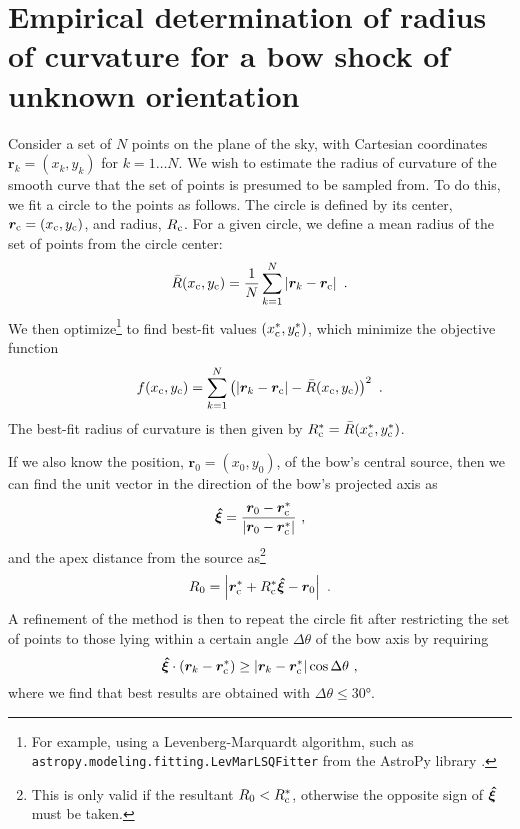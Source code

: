\section{Empirical determination of radius of curvature for a bow shock of unknown orientation}
\label{app:rcurv-empirical}

Consider a set of \(N\) points on the plane of the sky, with Cartesian
coordinates \(\bm{r}_k = (x_k, y_k)\) for \(k = 1 \dots N\).  We wish
to estimate the radius of curvature of the smooth curve that the set
of points is presumed to be sampled from.  To do this, we fit a circle
to the points as follows.  The circle is defined by its center,
\(\bm{r}_{\mathrm{c}} = (x_{\mathrm{c}}, y_{\mathrm{c}})\), and radius, \(R_{\mathrm{c}}\).  For a
given circle, we define a mean radius of the set of points from the
circle center:
\begin{equation}
  \label{eq:rcurv-mean-radius}
  \bar{R}(x_{\mathrm{c}}, y_{\mathrm{c}}) = \frac{1}{N}  \sum_{k = 1}^{N} \left\lvert\bm{r}_k - \bm{r}_{\mathrm{c}}\right\rvert  \ .
\end{equation}
We then optimize\footnote{%
  For example, using a Levenberg-Marquardt algorithm, such as
  \texttt{astropy.modeling.fitting.LevMarLSQFitter} from the AstroPy
  library \citep{Astropy-Collaboration:2013a}.} %
to find best-fit values \((x_{\mathrm{c}}^*, y_{\mathrm{c}}^*)\), which minimize the
objective function
\begin{equation}
  \label{eq:rcurv-objective-function}
  f(x_{\C}, y_{\C}) = \sum_{k = 1}^{N} \left(
    \abs{\bm{r}_k - \bm{r}_{\C}}  - \bar{R} (x_{\C}, y_{\C}) \right)^2 \ .
\end{equation}
The best-fit radius of curvature is then given by
\(R_{\mathrm{c}}^* = \bar{R}(x_{\mathrm{c}}^*, y_{\mathrm{c}}^*)\).

If we also know the position, \(\bm{r}_0 = (x_0, y_0)\), of the bow's
central source, then we can find the unit vector in the direction of
the bow's projected axis as
\begin{equation}
  \label{eq:rcurv-axis-vector}
  \bm{\hat{\xi}} = \frac {\bm{r}_0 - \bm{r}_{\mathrm{c}}^*} { \lvert\bm{r}_0 - \bm{r}_{\mathrm{c}}^*\rvert} \ , 
\end{equation}
and the apex distance from the source as\footnote{%
  This is only valid if the resultant \(R_0 < R_{\mathrm{c}}^*\), otherwise
  the opposite sign of \(\bm{\hat{\xi}}\) must be taken.}
\begin{equation}
  \label{eq:rcurv-apex-distance}
  R_0 = \Abs{\bm{r}_{\C}^* + R_{\C}^* \uvec{\xi} - \bm{r}_0} \ .
\end{equation}
A refinement of the method is then to repeat the circle fit after
restricting the set of points to those lying within a certain angle
\(\Delta\theta\) of the bow axis by requiring
\begin{equation}
  \label{eq:rcurv-delta-theta}
  \bm{\hat{\xi}} \cdot 
  {\left( \bm{r}_k - \bm{r}_{\ensuremath{\mathrm{c}}}^* \right) }
  \ge   {\left\lvert\bm{r}_k - \bm{r}_{\ensuremath{\mathrm{c}}}^*\right\rvert}
  \cos \Delta\theta \ ,
\end{equation}
where we find that best results are obtained with \(\Delta\theta \le \ang{30}\).

